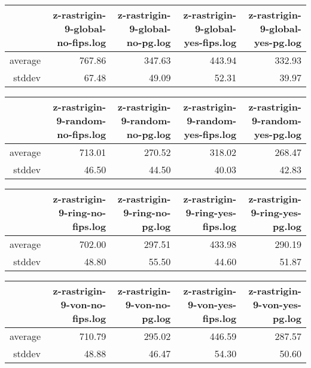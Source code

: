 \begin{table}[ht]
\centering
\begin{tabular}{rrrrr}
  \hline
 & z-rastrigin-9-global-no-fips.log & z-rastrigin-9-global-no-pg.log & z-rastrigin-9-global-yes-fips.log & z-rastrigin-9-global-yes-pg.log \\ 
  \hline
average & 767.86 & 347.63 & 443.94 & 332.93 \\ 
  stddev & 67.48 & 49.09 & 52.31 & 39.97 \\ 
   \hline
\end{tabular}
\end{table}
\begin{table}[ht]
\centering
\begin{tabular}{rrrrr}
  \hline
 & z-rastrigin-9-random-no-fips.log & z-rastrigin-9-random-no-pg.log & z-rastrigin-9-random-yes-fips.log & z-rastrigin-9-random-yes-pg.log \\ 
  \hline
average & 713.01 & 270.52 & 318.02 & 268.47 \\ 
  stddev & 46.50 & 44.50 & 40.03 & 42.83 \\ 
   \hline
\end{tabular}
\end{table}
\begin{table}[ht]
\centering
\begin{tabular}{rrrrr}
  \hline
 & z-rastrigin-9-ring-no-fips.log & z-rastrigin-9-ring-no-pg.log & z-rastrigin-9-ring-yes-fips.log & z-rastrigin-9-ring-yes-pg.log \\ 
  \hline
average & 702.00 & 297.51 & 433.98 & 290.19 \\ 
  stddev & 48.80 & 55.50 & 44.60 & 51.87 \\ 
   \hline
\end{tabular}
\end{table}
\begin{table}[ht]
\centering
\begin{tabular}{rrrrr}
  \hline
 & z-rastrigin-9-von-no-fips.log & z-rastrigin-9-von-no-pg.log & z-rastrigin-9-von-yes-fips.log & z-rastrigin-9-von-yes-pg.log \\ 
  \hline
average & 710.79 & 295.02 & 446.59 & 287.57 \\ 
  stddev & 48.88 & 46.47 & 54.30 & 50.60 \\ 
   \hline
\end{tabular}
\end{table}
